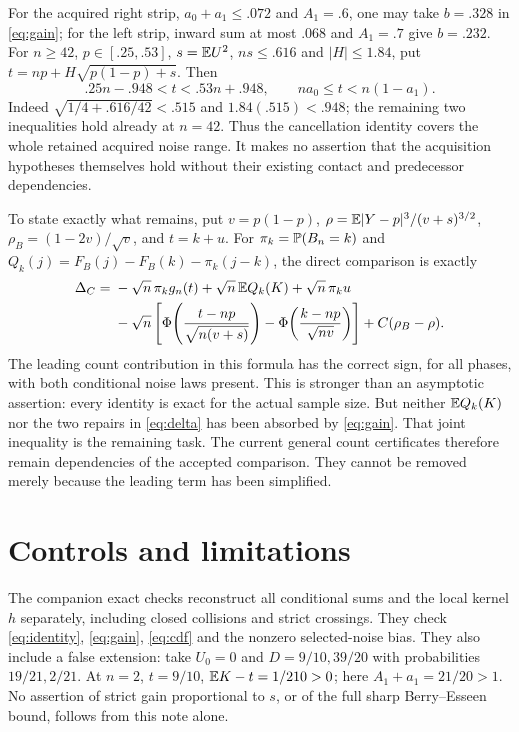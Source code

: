 \documentclass[11pt]{article}
\begin{document}
For the acquired right strip, $a_0+a_1\le.072$ and $A_1=.6$, one may
take $b=.328$ in \eqref{eq:gain}; for the left strip, inward sum at most
$.068$ and $A_1=.7$ give $b=.232$. For $n\ge42$, $p\in[.25,.53]$,
$s=\mathbb E U^2$, $ns\le.616$ and $|H|\le1.84$, put
$t=np+H\sqrt{p(1-p)+s}$. Then
\[
 .25n-.948<t<.53n+.948,\qquad
                   na_0\le t<n(1-a_1).
\]
Indeed $\sqrt{1/4+.616/42}<.515$ and $1.84(.515)<.948$;
the remaining two inequalities hold already at $n=42$. Thus the
cancellation identity covers the whole retained acquired noise range.
It makes no assertion that the acquisition hypotheses themselves hold
without their existing contact and predecessor dependencies.

To state exactly what remains, put $v=p(1-p)$,
$\rho=\mathbb E|Y-p|^3/(v+s)^{3/2}$, $\rho_B=(1-2v)/\sqrt v$, and $t=k+u$.
For $\pi_k=\mathbb P(B_n=k)$ and
$Q_k(j)=F_B(j)-F_B(k)-\pi_k(j-k)$, the direct comparison is exactly
\begin{align}\label{eq:delta}
 \Delta_C={}&-\sqrt n\,\pi_k g_n(t)+\sqrt n\,\mathbb E Q_k(K)
              +\sqrt n\,\pi_k u\notag\\
 &-\sqrt n\left[
 \Phi\!\left(\frac{t-np}{\sqrt{n(v+s)}}\right)
 -\Phi\!\left(\frac{k-np}{\sqrt{nv}}\right)\right]
              +C(\rho_B-\rho).
\end{align}
The leading count contribution in this formula has the correct sign, for
all phases, with both conditional noise laws present. This is stronger than
an asymptotic assertion: every identity is exact for the actual sample size.
But neither $\mathbb E Q_k(K)$ nor the two repairs in \eqref{eq:delta} has been
absorbed by \eqref{eq:gain}. That joint inequality is the remaining task.
The current general count certificates therefore remain dependencies of the
accepted comparison. They cannot be removed merely because the leading
term has been simplified.

\section*{Controls and limitations}
The companion exact checks reconstruct all conditional sums and the local
kernel $h$ separately, including closed collisions and strict crossings.
They check \eqref{eq:identity}, \eqref{eq:gain}, \eqref{eq:cdf} and the
nonzero selected-noise bias. They also include a false extension: take
$U_0=0$ and $D=9/10,39/20$ with probabilities $19/21,2/21$.
At $n=2$, $t=9/10$, $\mathbb E K-t=1/210>0$; here $A_1+a_1=21/20>1$.
No assertion of strict gain proportional to $s$, or of the full sharp
Berry--Esseen bound, follows from this note alone.
\end{document}
